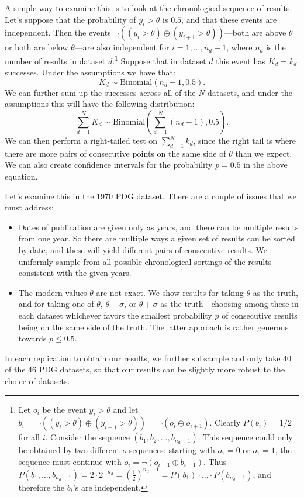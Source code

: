 \documentclass[letterpaper,12pt]{article}
\begin{document}
A simple way to examine this is to look at the chronological sequence of results. Let's suppose that the probability of $y_i>\theta$ is $0.5$, and that these events are independent. Then the events $\neg((y_i>\theta)\oplus(y_{i+1}>\theta))$---both are above $\theta$ or both are below $\theta$---are also independent for $i=1,\ldots,n_d-1$, where $n_d$ is the number of results in dataset $d$.\footnote{Let $o_i$ be the event $y_i>\theta$ and let $b_i=\neg((y_i>\theta)\oplus(y_{i+1}>\theta))=\neg(o_i\oplus o_{i+1})$. Clearly $P(b_i)=1/2$ for all $i$. Consider the sequence $(b_1,b_2,\ldots,b_{n_d-1})$. This sequence could only be obtained by two different $o$ sequences: starting with $o_1=0$ or $o_1=1$, the sequence must continue with $o_i=\neg(o_{i-1}\oplus b_{i-1})$. Thus $P(b_1,\ldots,b_{n_d-1})=2\cdot 2^{-n_d}=(\frac{1}{2})^{n_d-1}=P(b_1)\cdot\ldots\cdot P(b_{n_d-1})$, and therefore the $b_i$'s are independent.} Suppose that in dataset $d$ this event has $K_d=k_d$ successes. Under the assumptions we have that:
\[K_d\sim\mathrm{Binomial}(n_d-1,0.5).\]
We can further sum up the successes across all of the $N$ datasets, and under the assumptions this will have the following distribution:
\[\sum_{d=1}^NK_d\sim \mathrm{Binomial}\left(\sum_{d=1}^N(n_d-1),0.5\right).\]
We can then perform a right-tailed test on $\sum_{d=1}^N k_d$, since the right tail is where there are more pairs of consecutive points on the same side of $\theta$ than we expect. We can also create confidence intervals for the probability $p=0.5$ in the above equation.

Let's examine this in the 1970 PDG dataset. There are a couple of issues that we must address:
\begin{itemize}
  \item Dates of publication are given only as years, and there can be multiple results from one year. So there are multiple ways a given set of results can be sorted by date, and these will yield different pairs of consecutive results. We uniformly sample from all possible chronological sortings of the results consistent with the given years.
  \item The modern values $\theta$ are not exact. We show results for taking $\theta$ as the truth, and for taking one of $\theta$, $\theta-\sigma$, or $\theta+\sigma$ as the truth---choosing among these in each dataset whichever favors the smallest probability $p$ of consecutive results being on the same side of the truth. The latter approach is rather generous towards $p\leq 0.5$.
\end{itemize}
In each replication to obtain our results, we further subsample and only take 40 of the 46 PDG datasets, so that our results can be slightly more robust to the choice of datasets.
\end{document}
